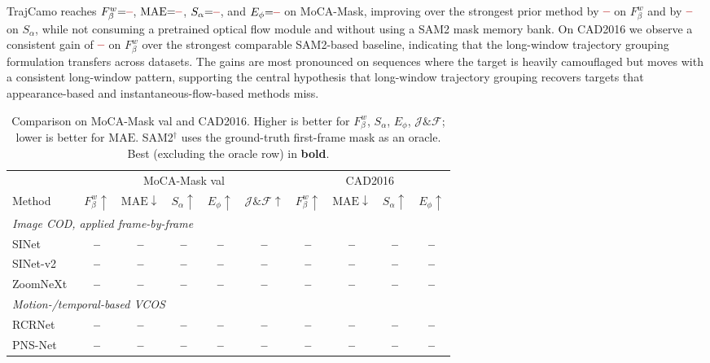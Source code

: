 \documentclass[11pt]{article}
\newcommand{\TBD}{\textcolor{red!70!black}{\textbf{--}}}
\begin{document}
TrajCamo reaches $F^w_\beta{=}\TBD$, $\mathrm{MAE}{=}\TBD$, $S_\alpha{=}\TBD$, and $E_\phi{=}\TBD$ on MoCA-Mask, improving over the strongest prior method by $\TBD$ on $F^w_\beta$ and by $\TBD$ on $S_\alpha$, while not consuming a pretrained optical flow module and without using a SAM2 mask memory bank.
On CAD2016 we observe a consistent gain of $\TBD$ on $F^w_\beta$ over the strongest comparable SAM2-based baseline, indicating that the long-window trajectory grouping formulation transfers across datasets.
The gains are most pronounced on sequences where the target is heavily camouflaged but moves with a consistent long-window pattern, supporting the central hypothesis that long-window trajectory grouping recovers targets that appearance-based and instantaneous-flow-based methods miss.

\begin{table}[t]
\centering
\caption{Comparison on MoCA-Mask val and CAD2016. Higher is better for $F^w_\beta$, $S_\alpha$, $E_\phi$, $\mathcal{J}\&\mathcal{F}$; lower is better for $\mathrm{MAE}$. SAM2$^\dagger$ uses the ground-truth first-frame mask as an oracle. Best (excluding the oracle row) in \textbf{bold}.}
\label{tab:moca}
\small
\setlength{\tabcolsep}{4pt}
\begin{tabular}{lccccc|cccc}
\toprule
& \multicolumn{5}{c|}{MoCA-Mask val} & \multicolumn{4}{c}{CAD2016} \\
Method & $F^w_\beta\uparrow$ & $\mathrm{MAE}\downarrow$ & $S_\alpha\uparrow$ & $E_\phi\uparrow$ & $\mathcal{J}\&\mathcal{F}\uparrow$ & $F^w_\beta\uparrow$ & $\mathrm{MAE}\downarrow$ & $S_\alpha\uparrow$ & $E_\phi\uparrow$ \\
\midrule
\multicolumn{10}{l}{\emph{Image COD, applied frame-by-frame}} \\
SINet~\cite{cod10k}                  & \TBD & \TBD & \TBD & \TBD & \TBD & \TBD & \TBD & \TBD & \TBD \\
SINet-v2~\cite{sinetv2}              & \TBD & \TBD & \TBD & \TBD & \TBD & \TBD & \TBD & \TBD & \TBD \\
ZoomNeXt~\cite{zoomnext}             & \TBD & \TBD & \TBD & \TBD & \TBD & \TBD & \TBD & \TBD & \TBD \\
\midrule
\multicolumn{10}{l}{\emph{Motion-/temporal-based VCOS}} \\
RCRNet~\cite{rcrnet}                 & \TBD & \TBD & \TBD & \TBD & \TBD & \TBD & \TBD & \TBD & \TBD \\
PNS-Net~\cite{pnsnet}                & \TBD & \TBD & \TBD & \TBD & \TBD & \TBD & \TBD & \TBD & \TBD \\

\end{tabular}
\end{table}
\end{document}
